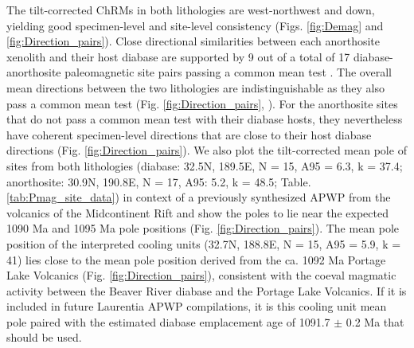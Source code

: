 The tilt-corrected ChRMs in both lithologies are west-northwest and down, yielding good specimen-level and site-level consistency (Figs. \ref{fig:Demag} and \ref{fig:Direction_pairs}). Close directional similarities between each anorthosite xenolith and their host diabase are supported by 9 out of a total of 17 diabase-anorthosite paleomagnetic site pairs passing a common mean test \citep{McFadden1990a}. The overall mean directions between the two lithologies are indistinguishable as they also pass a common mean test (Fig. \ref{fig:Direction_pairs}, \citealp{McFadden1990a}). For the anorthosite sites that do not pass a common mean test with their diabase hosts, they nevertheless have coherent specimen-level directions that are close to their host diabase directions (Fig. \ref{fig:Direction_pairs}). We also plot the tilt-corrected mean pole of sites from both lithologies (diabase: 32.5\textdegree N, 189.5\textdegree E, N = 15, A95 = 6.3, k = 37.4; anorthosite: 30.9\textdegree N, 190.8\textdegree E, N = 17, A95: 5.2, k = 48.5; Table. \ref{tab:Pmag_site_data}) in context of a previously synthesized APWP from the volcanics of the Midcontinent Rift \citep{Swanson-Hysell2019a} and show the poles to lie near the expected 1090 Ma and 1095 Ma pole positions (Fig. \ref{fig:Direction_pairs}). The mean pole position of the interpreted cooling units (32.7\textdegree N, 188.8\textdegree E, N = 15, A95 = 5.9, k = 41) lies close to the mean pole position derived from the ca. 1092 Ma Portage Lake Volcanics (Fig. \ref{fig:Direction_pairs}), consistent with the coeval magmatic activity between the Beaver River diabase and the Portage Lake Volcanics. If it is included in future Laurentia APWP compilations, it is this cooling unit mean pole paired with the estimated diabase emplacement age of 1091.7 $\pm$ 0.2 Ma that should be used.


